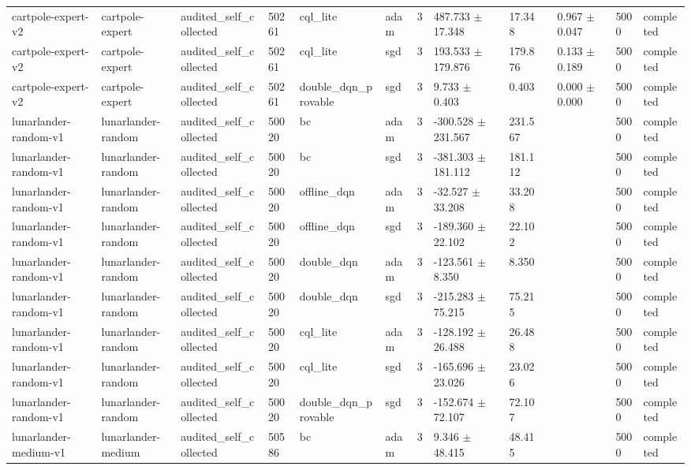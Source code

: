 \begin{table}[t]
\begin{tabular}{llllllllllll}
cartpole-expert-v2 & cartpole-expert & audited\_self\_collected & 50261 & cql\_lite & adam & 3 & 487.733 $\pm$ 17.348 & 17.348 &  & 0.967 $\pm$ 0.047 & 5000 & completed \\
cartpole-expert-v2 & cartpole-expert & audited\_self\_collected & 50261 & cql\_lite & sgd & 3 & 193.533 $\pm$ 179.876 & 179.876 &  & 0.133 $\pm$ 0.189 & 5000 & completed \\
cartpole-expert-v2 & cartpole-expert & audited\_self\_collected & 50261 & double\_dqn\_provable & sgd & 3 & 9.733 $\pm$ 0.403 & 0.403 &  & 0.000 $\pm$ 0.000 & 5000 & completed \\
lunarlander-random-v1 & lunarlander-random & audited\_self\_collected & 50020 & bc & adam & 3 & -300.528 $\pm$ 231.567 & 231.567 &  &  & 5000 & completed \\
lunarlander-random-v1 & lunarlander-random & audited\_self\_collected & 50020 & bc & sgd & 3 & -381.303 $\pm$ 181.112 & 181.112 &  &  & 5000 & completed \\
lunarlander-random-v1 & lunarlander-random & audited\_self\_collected & 50020 & offline\_dqn & adam & 3 & -32.527 $\pm$ 33.208 & 33.208 &  &  & 5000 & completed \\
lunarlander-random-v1 & lunarlander-random & audited\_self\_collected & 50020 & offline\_dqn & sgd & 3 & -189.360 $\pm$ 22.102 & 22.102 &  &  & 5000 & completed \\
lunarlander-random-v1 & lunarlander-random & audited\_self\_collected & 50020 & double\_dqn & adam & 3 & -123.561 $\pm$ 8.350 & 8.350 &  &  & 5000 & completed \\
lunarlander-random-v1 & lunarlander-random & audited\_self\_collected & 50020 & double\_dqn & sgd & 3 & -215.283 $\pm$ 75.215 & 75.215 &  &  & 5000 & completed \\
lunarlander-random-v1 & lunarlander-random & audited\_self\_collected & 50020 & cql\_lite & adam & 3 & -128.192 $\pm$ 26.488 & 26.488 &  &  & 5000 & completed \\
lunarlander-random-v1 & lunarlander-random & audited\_self\_collected & 50020 & cql\_lite & sgd & 3 & -165.696 $\pm$ 23.026 & 23.026 &  &  & 5000 & completed \\
lunarlander-random-v1 & lunarlander-random & audited\_self\_collected & 50020 & double\_dqn\_provable & sgd & 3 & -152.674 $\pm$ 72.107 & 72.107 &  &  & 5000 & completed \\
lunarlander-medium-v1 & lunarlander-medium & audited\_self\_collected & 50586 & bc & adam & 3 & 9.346 $\pm$ 48.415 & 48.415 &  &  & 5000 & completed \\

\end{tabular}
\end{table}
